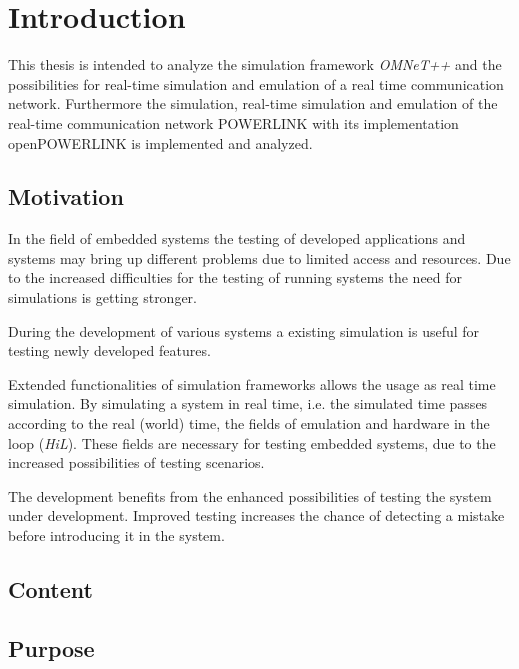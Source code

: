 \chapter{Introduction}
\label{cha:introduction}
This thesis is intended to analyze the simulation framework \emph{OMNeT++} and the possibilities for real-time simulation and emulation of a real time communication network.
Furthermore the simulation, real-time simulation and emulation of the real-time communication network POWERLINK with its implementation openPOWERLINK is implemented and analyzed.

\section{Motivation}
In the field of embedded systems the testing of developed applications and systems may bring up different problems due to limited access and resources.
Due to the increased difficulties for the testing of running systems the need for simulations is getting stronger.

During the development of various systems a existing simulation is useful for testing newly developed features.

Extended functionalities of simulation frameworks allows the usage as real time simulation.
By simulating a system in real time, i.e. the simulated time passes according to the real (world) time, the fields of emulation and hardware in the loop (\emph{HiL}).
These fields are necessary for testing embedded systems, due to the increased possibilities of testing scenarios.

The development benefits from the enhanced possibilities of testing the system under development.
Improved testing increases the chance of detecting a mistake before introducing it in the system.



\section{Content}

\section{Purpose}

